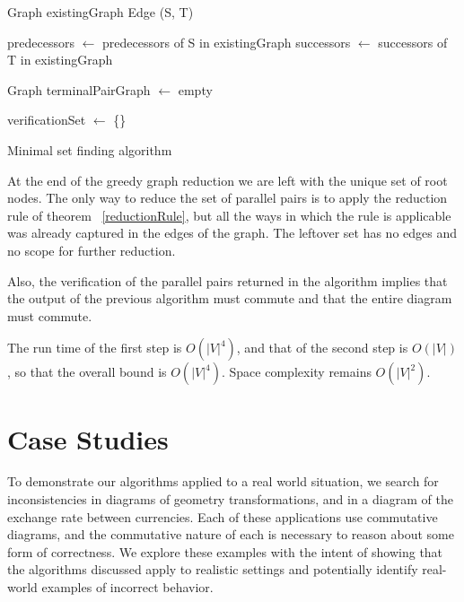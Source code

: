 \documentclass[sigplan]{acmart}
\begin{document}
\begin{algorithm}
\DontPrintSemicolon
{}
Graph existingGraph\;
Edge (S, T)\;
        
predecessors $\gets$ predecessors of S in existingGraph\;
successors $\gets$ successors of T in existingGraph\;

Graph terminalPairGraph $\gets$ empty \;

verificationSet $\gets$ \{\}\;
\;
\caption{Minimal set finding algorithm}
\label{algo_online_minimal}
\end{algorithm}

At the end of the greedy graph reduction we are left with the unique set of root nodes.
The only way to reduce the set of parallel pairs is to apply the reduction rule of theorem ~\ref{reductionRule}, but all the ways in which the rule is applicable was already captured in the edges of the graph. The leftover set has no edges and no scope for further reduction.

Also, the verification of the parallel pairs returned in the algorithm implies that the output of the previous algorithm must commute and that the entire diagram must commute.

The run time of the first step is $O(|V|^4)$, and that of the second step is $O(|V|)$, so that the overall bound is $O(|V|^4)$.
Space complexity remains $O(|V|^2)$.

\section{Case Studies}

To demonstrate our algorithms applied to a real world situation, we search for inconsistencies in diagrams of geometry transformations, and in a diagram of the exchange rate between currencies.
Each of these applications use commutative diagrams, and the commutative nature of each is necessary to reason about some form of correctness.
We explore these examples with the intent of showing that the algorithms discussed apply to realistic settings and potentially identify real-world examples of incorrect behavior.
\end{document}
